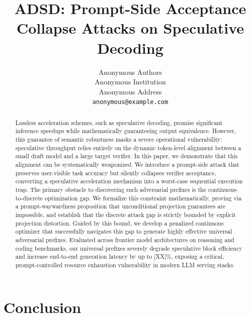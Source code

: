 \documentclass{article}
\title{ADSD: Prompt-Side Acceptance Collapse Attacks on Speculative Decoding}
\author{%
  Anonymous Authors \\
  Anonymous Institution \\
  Anonymous Address \\
  \texttt{anonymous@example.com} \\
}
\begin{document}
\maketitle

\begin{abstract}
Lossless acceleration schemes, such as speculative decoding, promise significant inference speedups while mathematically guaranteeing output equivalence. However, this guarantee of semantic robustness masks a severe operational vulnerability: speculative throughput relies entirely on the dynamic token-level alignment between a small draft model and a large target verifier. In this paper, we demonstrate that this alignment can be systematically weaponized. We introduce a prompt-side attack that preserves user-visible task accuracy but silently collapses verifier acceptance, converting a speculative acceleration mechanism into a worst-case sequential execution trap. The primary obstacle to discovering such adversarial prefixes is the continuous-to-discrete optimization gap. We formalize this constraint mathematically, proving via a prompt-waywardness proposition that unconditional projection guarantees are impossible, and establish that the discrete attack gap is strictly bounded by explicit projection distortion. Guided by this bound, we develop a penalized continuous optimizer that successfully navigates this gap to generate highly effective universal adversarial prefixes. Evaluated across frontier model architectures on reasoning and coding benchmarks, our universal prefixes severely degrade speculative block efficiency and increase end-to-end generation latency by up to [XX]\%, exposing a critical, prompt-controlled resource exhaustion vulnerability in modern LLM serving stacks.
\end{abstract}







\section{Conclusion}
\end{document}
